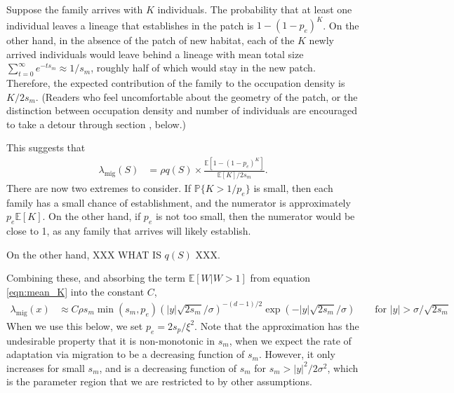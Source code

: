\documentclass{article}
\newcommand{\linelabel}[1]{}
\renewcommand{\P}{\mathbb{P}}
\newcommand{\E}{\mathbb{E}}
\newcommand{\migrate}{\lambda_\text{mig}}
\newcommand{\secref}[1]{{\emph{\nameref{#1}}}}
\begin{document}
Suppose the family arrives with $K$ individuals.
The probability that at least one individual leaves a lineage that establishes in the patch
is $1-(1-p_e)^K$.
On the other hand, in the absence of the patch of new habitat,
each of the $K$ newly arrived individuals would leave behind a lineage with 
mean total size $\sum_{t=0}^\infty e^{-t s_m} \approx 1/s_m$,
roughly half of which would stay in the new patch.
Therefore, the expected contribution of the family to the occupation density is $K/2s_m$.
(Readers who feel uncomfortable about the geometry of the patch,
or the distinction between occupation density and number of individuals
are encouraged to take a detour through section \secref{ss:hitting_occupation}, below.)

This suggests that 
\begin{align} \label{eqn:ratio_K}
  \migrate(S) 
    &= \rho q(S) \times 
    \frac{
        \E[1-(1-p_e)^K]
    }{
        \E[K]/2s_m
    } .
\end{align}
There are now two extremes to consider.
If $\P\{K>1/p_e\}$ is small, then each family has a small chance of establishment,
and the numerator is approximately $p_e \E[K]$.
On the other hand, if $p_e$ is not too small,
then the numerator would be close to 1, as any family that arrives will likely establish.

On the other hand, XXX WHAT IS $q(S)$ XXX.

Combining these, and absorbing the term $\E[W|W>1]$ from equation \eqref{eqn:mean_K} 
into the constant $C$,
\begin{align} \label{eqn:migrate}
  \migrate(x) &\approx C \rho s_m \min(s_m,p_e) \left( |y| \sqrt{2 s_m}/\sigma \right)^{-(d-1)/2} \exp( - |y| \sqrt{2 s_m} / \sigma)  \qquad \text{for } |y| > \sigma/\sqrt{2 s_m} 
\end{align}
When we use this below, we set $p_e = 2 s_p / \xi^2$.
Note that the approximation has the undesirable property that it is
non-monotonic in $s_m$, when we expect the rate of adaptation via
migration to be a decreasing function of $s_m$. However, it only increases for small $s_m$, 
and is a decreasing function of $s_m$ for $s_m > |y|^2 / 2 \sigma^2$, 
which is the parameter region that we are restricted to by other assumptions.
\linelabel{rr:sm_condition}
\end{document}
